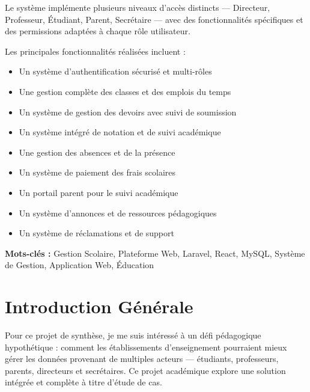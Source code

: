 \documentclass[12pt,a4paper]{report}
\begin{document}
    Le système implémente plusieurs niveaux d'accès distincts — Directeur, Professeur, Étudiant, Parent, Secrétaire — avec des fonctionnalités spécifiques et des permissions adaptées à chaque rôle utilisateur.

    Les principales fonctionnalités réalisées incluent :
    \begin{itemize}
        \item Un système d'authentification sécurisé et multi-rôles
        \item Une gestion complète des classes et des emplois du temps
        \item Un système de gestion des devoirs avec suivi de soumission
        \item Un système intégré de notation et de suivi académique
        \item Une gestion des absences et de la présence
        \item Un système de paiement des frais scolaires
        \item Un portail parent pour le suivi académique
        \item Un système d'annonces et de ressources pédagogiques
        \item Un système de réclamations et de support
    \end{itemize}

    \vspace{0.8cm}
    \noindent\textbf{Mots-clés :} Gestion Scolaire, Plateforme Web, Laravel, React, MySQL, Système de Gestion, Application Web, Éducation

    \vspace{1cm}


    \newpage
    \chapter*{Introduction Générale}

    Pour ce projet de synthèse, je me suis intéressé à un défi pédagogique hypothétique : comment les établissements d'enseignement pourraient mieux gérer les données provenant de multiples acteurs — étudiants, professeurs, parents, directeurs et secrétaires. Ce projet académique explore une solution intégrée et complète à titre d'étude de cas.
\end{document}
